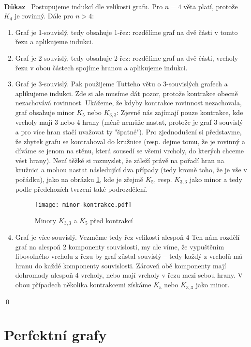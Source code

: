 \documentclass{article}
\renewcommand{\paragraph}[1]{\ \\\smallskip\noindent\textbf{#1}\ }
\begin{document}
\paragraph{Důkaz}
Postupujeme indukcí dle velikosti grafu. Pro $n=4$ věta platí, protože $K_4$ je 
rovinný. Dále pro $n>4$:
\begin{enumerate}
	\item Graf je 1-souvislý, tedy obsahuje 1-řez: rozdělíme graf na dvě části v 
	tomto řezu a aplikujeme indukci.
	\item Graf je 2-souvislý, tedy obsahuje 2-řez: rozdělíme graf na dvě části, 
	vrcholy řezu v obou částech spojíme hranou a aplikujeme indukci.
	\item Graf je 3-souvislý. Pak použijeme Tutteho větu o 3-souvislých grafech 
	a aplikujeme indukci. Zde si ale musíme dát pozor, protože kontrakce obecně 
	nezachovává rovinnost. Ukážeme, že kdyby kontrakce rovinnost nezachovala, 
	graf obsahuje minor $K_5$ nebo $K_{3,3}$: Zjevně nás zajímají pouze 
	kontrakce, kde vrcholy mají 3 nebo 4 hrany (méně nemůže nastat, protože je 
	graf 3-souvislý a pro více hran stačí uvažovat ty "špatné"). Pro 
	zjednodušení si představme, že zbytek grafu se kontrahoval do kružnice 
	(resp. dejme tomu, že je rovinný a díváme se jenom na stěnu, která sousedí 
	se všemi vrcholy, do kterých chceme vést hrany). Není těžké si rozmyslet, že 
	záleží právě na pořadí hran na kružnici a mohou nastat následující dva 
	případy (tedy kromě toho, že je vše v pořádku), jako na obrázku 
	\ref{minory:kontrakce}, kde je zřejmě $K_5$, resp. $K_{3,3}$ jako minor a 
	tedy podle předchozích tvrzení také podrozdělení.
\begin{figure}[H]
\centering
\texttt{[image: minor-kontrakce.pdf]}
\caption{Minory $K_{3,3}$ a $K_{5}$ před kontrakcí}
\label{minory:kontrakce}
\end{figure}
	\item Graf je více-souvislý. Vezměme tedy řez velikosti alespoň $4$ Ten nám 
	rozdělí graf na alespoň $2$ komponenty souvislosti, my ale víme, že 
	vypuštěním libovolného vrcholu z řezu by graf zůstal souvislý -- tedy každý 
	z vrcholů má hranu do každé komponenty souvislosti. Zároveň obě komponenty 
	mají dohromady alespoň $4$ vrcholy, nebo mají vrcholy v řezu mezi sebou 
	hrany. V obou případech několika kontrakcemi získáme $K_5$ nebo $K_{3,3}$ 
	jako minor.
\end{enumerate}
\qed

\section{Perfektní grafy}
\end{document}
